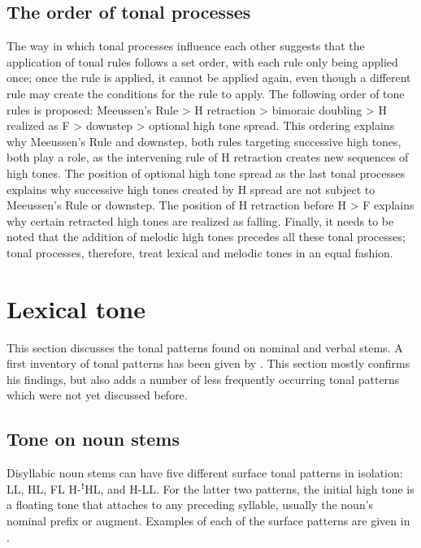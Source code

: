 \subsection{The order of tonal processes}
\label{bkm:Ref432073870}\hypertarget{Toc75352624}{}
The way in which tonal processes influence each other suggests that the application of tonal rules follows a set order, with each rule only being applied once; once the rule is applied, it cannot be applied again, even though a different rule may create the conditions for the rule to apply. The following order of tone rules is proposed: Meeussen’s Rule > H retraction > bimoraic doubling > H realized as F > downstep > optional high tone spread. This ordering explains why Meeussen’s Rule and downstep, both rules targeting successive high tones, both play a role, as the intervening rule of H retraction creates new sequences of high tones. The position of optional high tone spread as the last tonal processes explains why successive high tones created by H spread are not subject to Meeussen’s Rule or downstep. The position of H retrac\-tion before H > F explains why certain retracted high tones are realized as falling. Finally, it needs to be noted that the addition of melodic high tones precedes all these tonal processes; tonal pro\-cesses, therefore, treat lexical and melodic tones in an equal fashion.

\section{Lexical tone}
\label{bkm:Ref71539878}\hypertarget{Toc75352625}{}
This section discusses the tonal patterns found on nominal and verbal stems. A first inventory of tonal patterns has been given by {\citet{Bostoen2009}}. This section mostly confirms his findings, but also adds a number of less frequently occurring tonal pat\-terns which were not yet discussed before.

\subsection{Tone on noun stems}
\label{bkm:Ref71540184}\hypertarget{Toc75352626}{}
Disyllabic noun stems can have five different surface tonal patterns in isolation: LL, HL, FL H-ꜝHL, and H-LL. For the latter two patterns, the initial high tone is a floating tone that attaches to any preceding syllable, usually the noun’s nominal prefix or augment. Examples of each of the surface patterns are given in .

